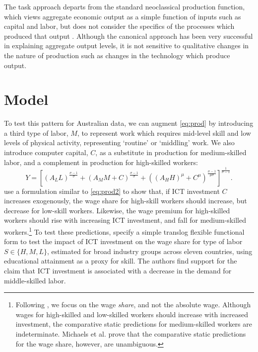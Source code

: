 The task approach departs from the standard neoclassical production function, which views aggregate economic output as a simple function of inputs such as capital and labor, but does not consider the specifics of the processes which produced that output \citep{Acemoglu2011}. Although the canonical approach has been very successful in explaining aggregate output levels, it is not sensitive to qualitative changes in the nature of production such as changes in the technology which produce output. 

\section{Model}

To test this pattern for Australian data, we can augment \eqref{eq:prod} by introducing a third type of labor, $M$, to represent work which requires mid-level skill and low levels of physical activity, representing `routine' or `middling' work. We also introduce computer capital, $C$, as a substitute in production for medium-skilled labor, and a complement in production for high-skilled workers:
\begin{equation}  \label{eq:prod2}
Y = \left[
  \left(A_LL \right)^\frac{\sigma-1}{\sigma}
  +
  \left(A_MM + C\right)^\frac{\sigma-1}{\sigma}
  +
  \left((A_HH)^\mu + C^\mu\right)^\frac{\sigma-1}{\mu\sigma}
  \right]^\frac{1}{\sigma-1}.
\end{equation}
\citet{Michaels2010} use a formulation similar to \eqref{eq:prod2} to show that, if ICT investment $C$ increases exogenously, the wage share for high-skill workers should increase, but decrease for low-skill workers. Likewise, the wage premium for high-skilled workers should rise with increasing ICT investment, and fall for medium-skilled workers.\footnote{Following \citet{Michaels2010}, we focus on the wage {\em share}, and not the absolute wage. Although wages for high-skilled and low-skilled workers should increase with increased investment, the comparative static predictions for medium-skilled workers are indeterminate. Michaels et al. prove that the comparative static predictions for the wage share, however, are unambiguous.} To test these predictions, \citet{Michaels2010} specify a simple translog flexible functional form to test the impact of ICT investment on the wage share for type of labor $S\in\{H,M,L\}$, estimated for broad industry groups across eleven countries, using educational attainment as a proxy for skill. The authors find support for the claim that ICT investment is associated with a decrease in the demand for middle-skilled labor. 

